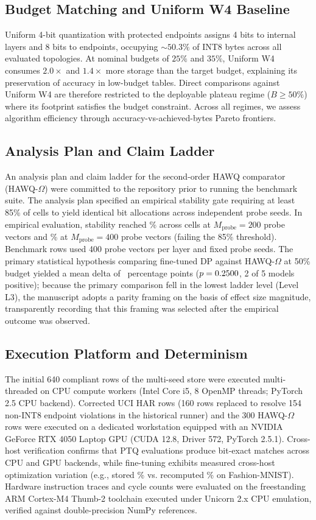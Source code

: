 \documentclass{ieeeaccess}
\begin{document}
\subsection{Budget Matching and Uniform W4 Baseline}
Uniform 4-bit quantization with protected endpoints assigns 4 bits to internal layers and 8 bits to endpoints, occupying $\sim 50.3\%$ of INT8 bytes across all evaluated topologies. At nominal budgets of $25\%$ and $35\%$, Uniform W4 consumes $2.0\times$ and $1.4\times$ more storage than the target budget, explaining its preservation of accuracy in low-budget tables. Direct comparisons against Uniform W4 are therefore restricted to the deployable plateau regime ($B \ge 50\%$) where its footprint satisfies the budget constraint. Across all regimes, we assess algorithm efficiency through accuracy-vs-achieved-bytes Pareto frontiers.

\subsection{Analysis Plan and Claim Ladder}
An analysis plan and claim ladder for the second-order HAWQ comparator (HAWQ-$\Omega$) were committed to the repository prior to running the benchmark suite. The analysis plan specified an empirical stability gate requiring at least 85\% of cells to yield identical bit allocations across independent probe seeds. In empirical evaluation, stability reached \MacroStabilityTwoHundred\% across cells at $M_{\text{probe}} = 200$ probe vectors and \MacroStabilityFourHundred\% at $M_{\text{probe}} = 400$ probe vectors (failing the 85\% threshold). Benchmark rows used 400 probe vectors per layer and fixed probe seeds. The primary statistical hypothesis comparing fine-tuned DP against HAWQ-$\Omega$ at 50\% budget yielded a mean delta of \MacroOmegaMeanDelta\ percentage points ($p = 0.2500$, 2 of 5 models positive); because the primary comparison fell in the lowest ladder level (Level L3), the manuscript adopts a parity framing on the basis of effect size magnitude, transparently recording that this framing was selected after the empirical outcome was observed.

\subsection{Execution Platform and Determinism}
The initial 640 compliant rows of the multi-seed store were executed multi-threaded on CPU compute workers (Intel Core i5, 8 OpenMP threads; PyTorch 2.5 CPU backend). Corrected UCI HAR rows (160 rows replaced to resolve 154 non-INT8 endpoint violations in the historical runner) and the 300 HAWQ-$\Omega$ rows were executed on a dedicated workstation equipped with an NVIDIA GeForce RTX 4050 Laptop GPU (CUDA 12.8, Driver 572, PyTorch 2.5.1). Cross-host verification confirms that PTQ evaluations produce bit-exact matches across CPU and GPU backends, while fine-tuning exhibits measured cross-host optimization variation (e.g., stored \MacroCrossHostStored\% vs. recomputed \MacroCrossHostRecomputed\% on Fashion-MNIST). Hardware instruction traces and cycle counts were evaluated on the freestanding ARM Cortex-M4 Thumb-2 toolchain executed under Unicorn 2.x CPU emulation, verified against double-precision NumPy references.
\end{document}
